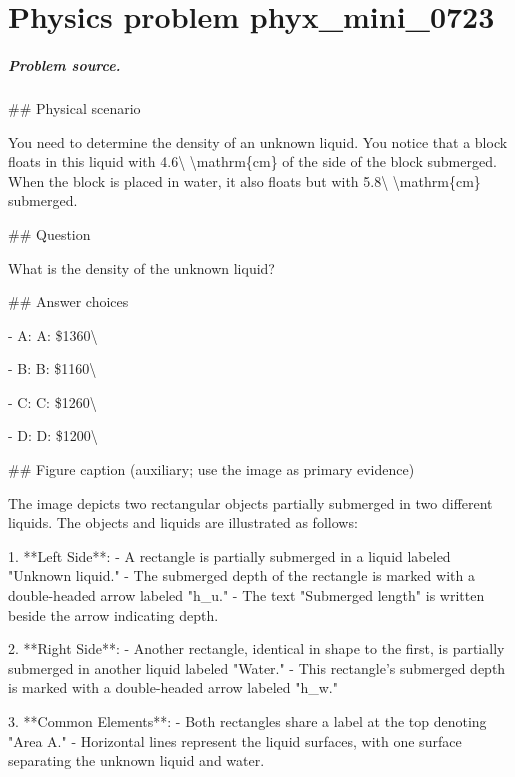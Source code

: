 
\chapter{Physics problem phyx\_mini\_0723}
\label{ch:PhyXMiniProblems_problem_phyx_mini_0723}

\paragraph{Problem source.}
\#\# Physical scenario

You need to determine the density of an unknown liquid. You notice that a block floats in this liquid with 4.6\textbackslash{} \textbackslash{}mathrm\{cm\} of the side of the block submerged. When the block is placed in water, it also floats but with 5.8\textbackslash{} \textbackslash{}mathrm\{cm\} submerged.

\#\# Question

What is the density of the unknown liquid?

\#\# Answer choices

- A: A: \$1360\textbackslash{}

- B: B: \$1160\textbackslash{}

- C: C: \$1260\textbackslash{}

- D: D: \$1200\textbackslash{}

\#\# Figure caption (auxiliary; use the image as primary evidence)

The image depicts two rectangular objects partially submerged in two different liquids. The objects and liquids are illustrated as follows:

1. **Left Side**: 
   - A rectangle is partially submerged in a liquid labeled "Unknown liquid."
   - The submerged depth of the rectangle is marked with a double-headed arrow labeled "h\_u."
   - The text "Submerged length" is written beside the arrow indicating depth.

2. **Right Side**:
   - Another rectangle, identical in shape to the first, is partially submerged in another liquid labeled "Water."
   - This rectangle’s submerged depth is marked with a double-headed arrow labeled "h\_w."

3. **Common Elements**:
   - Both rectangles share a label at the top denoting "Area A."
   - Horizontal lines represent the liquid surfaces, with one surface separating the unknown liquid and water.

